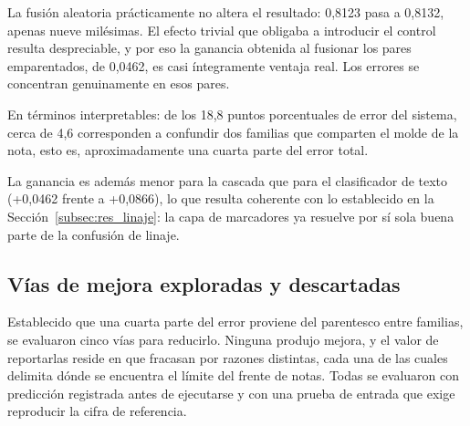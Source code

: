 La fusión aleatoria prácticamente no altera el resultado: 0,8123 pasa a 0,8132, apenas nueve milésimas. El efecto trivial que obligaba a introducir el control resulta despreciable, y por eso la ganancia obtenida al fusionar los pares emparentados, de 0,0462, es casi íntegramente ventaja real. Los errores se concentran genuinamente en esos pares.

En términos interpretables: de los 18,8 puntos porcentuales de error del sistema, cerca de 4,6 corresponden a confundir dos familias que comparten el molde de la nota, esto es, aproximadamente una cuarta parte del error total.

La ganancia es además menor para la cascada que para el clasificador de texto (+0,0462 frente a +0,0866), lo que resulta coherente con lo establecido en la Sección~\ref{subsec:res_linaje}: la capa de marcadores ya resuelve por sí sola buena parte de la confusión de linaje.


\subsection{Vías de mejora exploradas y descartadas}
\label{subsec:res_vias_descartadas}

Establecido que una cuarta parte del error proviene del parentesco entre familias, se evaluaron cinco vías para reducirlo. Ninguna produjo mejora, y el valor de reportarlas reside en que fracasan por razones distintas, cada una de las cuales delimita dónde se encuentra el límite del frente de notas. Todas se evaluaron con predicción registrada antes de ejecutarse y con una prueba de entrada que exige reproducir la cifra de referencia.

\begin{table}[ht]
\centering
\caption{Vías de mejora evaluadas sobre el sistema adoptado (149 notas, P2bal, 50 semillas)}
\label{tab:vias_descartadas}
\end{table}

